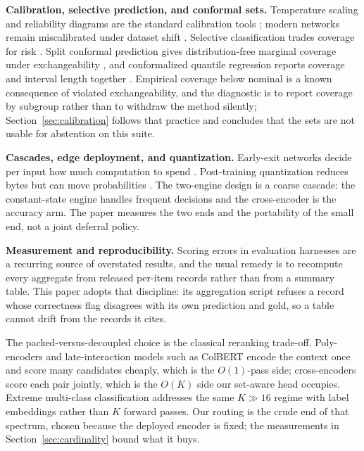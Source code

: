 \textbf{Calibration, selective prediction, and conformal sets.}
Temperature scaling and reliability diagrams are the standard calibration tools
\citep{guo2017calibration}; modern networks remain miscalibrated under dataset shift
\citep{ovadia2019uncertainty}. Selective classification trades coverage for risk
\citep{geifman2017selective,geifman2019selectivenet}. Split conformal prediction gives
distribution-free marginal coverage under exchangeability
\citep{lei2018distribution,angelopoulos2021gentle}, and conformalized quantile regression reports
coverage and interval length together \citep{romano2019cqr}. Empirical coverage below nominal is a
known consequence of violated exchangeability, and the diagnostic is to report coverage by
subgroup rather than to withdraw the method silently; Section~\ref{sec:calibration} follows that
practice and concludes that the sets are not usable for abstention on this suite.

\textbf{Cascades, edge deployment, and quantization.}
Early-exit networks decide per input how much computation to spend
\citep{teerapittayanon2016branchynet,xin2020fastbert,zhou2020deebert}. Post-training quantization
reduces bytes but can move probabilities
\citep{dettmers2022llmint8,frantar2023gptq,xiao2023smoothquant}. The two-engine design is a coarse
cascade: the constant-state engine handles frequent decisions and the cross-encoder is the
accuracy arm. The paper measures the two ends and the portability of the small end, not a joint
deferral policy.

\textbf{Measurement and reproducibility.}
Scoring errors in evaluation harnesses are a recurring source of overstated results, and the
usual remedy is to recompute every aggregate from released per-item records rather than from a
summary table. This paper adopts that discipline: its aggregation script refuses a record whose
correctness flag disagrees with its own prediction and gold, so a table cannot drift from the
records it cites.

The packed-versus-decoupled choice is the classical reranking trade-off. Poly-encoders
\citep{humeau2020poly} and late-interaction models such as ColBERT \citep{khattab2020colbert} encode
the context once and score many candidates cheaply, which is the $O(1)$-pass side; cross-encoders
score each pair jointly, which is the $O(K)$ side our set-aware head occupies. Extreme
multi-class classification addresses the same $K\gg16$ regime with label embeddings rather than
$K$ forward passes. Our routing is the crude end of that spectrum, chosen because the deployed
encoder is fixed; the measurements in Section~\ref{sec:cardinality} bound what it buys.

